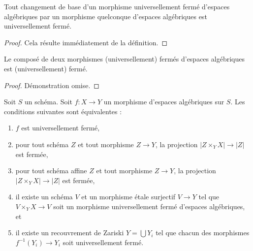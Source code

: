 \begin{lemma}
\label{lemma-base-change-universally-closed}
Tout changement de base d'un morphisme universellement fermé d'espaces algébriques
par un morphisme quelconque d'espaces algébriques est universellement fermé.
\end{lemma}

\begin{proof}
Cela résulte immédiatement de la définition.
\end{proof}

\begin{lemma}
\label{lemma-composition-universally-closed}
Le composé de deux morphismes (universellement) fermés d'espaces algébriques
est (universellement) fermé.
\end{lemma}

\begin{proof}
Démonstration omise.
\end{proof}

\begin{lemma}
\label{lemma-universally-closed-local}
Soit $S$ un schéma. Soit $f : X \to Y$ un morphisme d'espaces algébriques
sur $S$. Les conditions suivantes sont équivalentes :
\begin{enumerate}
\item $f$ est universellement fermé,
\item pour tout schéma $Z$ et tout morphisme $Z \to Y$,
la projection $|Z \times_Y X| \to |Z|$ est fermée,
\item pour tout schéma affine $Z$ et tout morphisme $Z \to Y$,
la projection $|Z \times_Y X| \to |Z|$ est fermée,
\item il existe un schéma $V$ et un morphisme \'etale surjectif
$V \to Y$ tel que $V \times_Y X \to V$ soit un morphisme universellement fermé
d'espaces algébriques, et
\item il existe un recouvrement de Zariski $Y = \bigcup Y_i$ tel que
chacun des morphismes $f^{-1}(Y_i) \to Y_i$ soit universellement fermé.
\end{enumerate}
\end{lemma}

